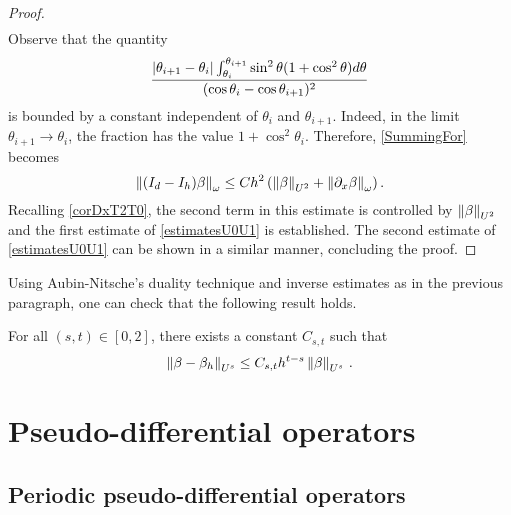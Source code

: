 \documentclass[a4paper]{article}
\begin{document}
\begin{proof}
\begin{eqnarray*}
	\end{eqnarray*}
	Observe that the quantity 
	\[\frac{\left\lvert \theta_{i+1} - \theta_i \right\rvert \int_{\theta_i}^{\theta_{i+1}}{\sin^2\theta(1 + \cos^2\theta)d\theta}}{(\cos\theta_{i} - \cos\theta_{i+1})^2}\]
	is bounded by a constant independent of $\theta_i$ and $\theta_{i+1}$. Indeed, in the limit $\theta_{i+1} \to \theta_{i}$, the fraction has the value $1 + \cos^2\theta_i$. Therefore, \eqref{SummingFor} becomes
	\[\left\|(I_d - I_h)\beta\right\|_{\omega} \leq C h^2\left(\left\|\beta\right\|_{U^2} + \left\|\partial_x \beta\right\|_{\omega}\right).\]
	Recalling \autoref{corDxT2T0}, the second term in this estimate is controlled by $\left\|\beta\right\|_{U^2}$ and the first estimate of \eqref{estimatesU0U1} is established. 
	The second estimate of \eqref{estimatesU0U1} can be shown in a similar manner, concluding the proof.  
\end{proof}
\noindent Using Aubin-Nitsche's duality technique and inverse estimates as in the previous paragraph, one can check that the following result holds.
\begin{Cor}
	For all $(s,t) \in [0,2]$, there exists a constant $C_{s,t}$ such that
	\[\left\|\beta - \beta_h\right\|_{U^s} \leq C_{s,t} h^{t - s}\left\|\beta\right\|_{U^s}\,.\]
\end{Cor}


\section{Pseudo-differential operators}







\subsection{Periodic pseudo-differential operators}
\end{document}
